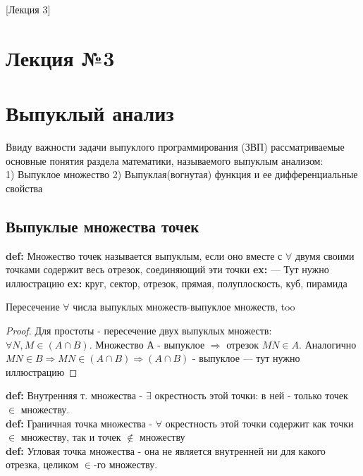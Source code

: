 [Лекция 3]


\section{Лекция №3}
\section*{Выпуклый анализ}
Ввиду важности задачи выпуклого программирования (ЗВП) рассматриваемые основные понятия раздела математики, называемого выпуклым анализом: \\ 1) Выпуклое множество 2) Выпуклая(вогнутая) функция и ее дифференциальные свойства

\subsection*{Выпуклые множества точек}
\textbf{def:}
Множество точек называется выпуклым, если оно вместе с $\forall$ двумя своими точками содержит весь отрезок, соединяющий эти точки
\textbf{ex:} --- Тут нужно иллюстрацию
\textbf{ex:} круг, сектор, отрезок, прямая, полуплоскость, куб, пирамида

\begin{theorem}
Пересечение $\forall$ числа выпуклых множеств-выпуклое множеств, too
\end{theorem}

\renewcommand\qedsymbol{$\blacksquare$}

\begin{proof}
Для простоты - пересечение двух выпуклых множеств: \\ $\forall N,M \in (A \cap B)$. Множество А - выпуклое $\Rightarrow$ отрезок $MN \in A$. Аналогично \\ $MN \in B $$\Rightarrow$$ MN \in (A \cap B) $$\Rightarrow$$ (A \cap B)$ - выпуклое --- тут нужно иллюстрацию
\end{proof}

\textbf{def:} Внутренняя т. множества - $\exists$ окрестность этой точки: в ней - только точек $\in$ множеству. \\

\textbf{def:} Граничная точка множества - $\forall$ окрестность этой точки содержит как точки $\in$ множеству, так и точек $\notin$ множеству \\

\textbf{def:} Угловая точка множества - она не является внутренней ни для какого отрезка, целиком $\in$-го множеству. \\

